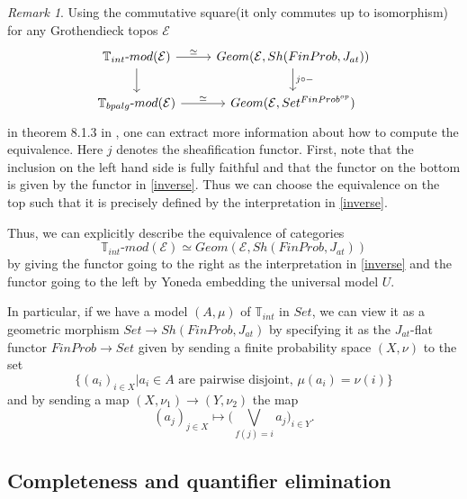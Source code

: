 \documentclass[a4paper]{amsproc}
\theoremstyle{plain}
\theoremstyle{definition}
\theoremstyle{remark}
\newtheorem{remark}[theorem]{Remark}
\numberwithin{equation}{section}
\begin{document}
\begin{remark} \label{classifying_equiv_data}
Using the commutative square(it only commutes up to isomorphism) for any Grothendieck topos $\mathcal{E}$
\[
\begin{tikzcd}
\mathbb{T}_{int}\text{-}mod(\mathcal{E}) \arrow[d] \arrow[r, "\simeq"] & {Geom(\mathcal{E},Sh(FinProb,J_{at}))} \arrow[d, "j \circ -"] \\
\mathbb{T}_{bpalg}\text{-}mod(\mathcal{E}) \arrow[r, "\simeq"]         & {Geom(\mathcal{E},Set^{FinProb^{op}})}                       
\end{tikzcd}
\]
in theorem 8.1.3 in \cite{caramello_book}, one can extract more information about how to compute the equivalence. Here $j$ denotes the sheafification functor. First, note that the inclusion on the left hand side is fully faithful and that the functor on the bottom is given by the functor in \ref{inverse}. Thus we can choose the equivalence on the top such that it is precisely defined by the interpretation in \ref{inverse}.

Thus, we can explicitly describe the equivalence of categories
\[
    \mathbb{T}_{int}\text{-}mod(\mathcal{E}) \simeq Geom(\mathcal{E},Sh(FinProb,J_{at}))
\]
by giving the functor going to the right as the interpretation in \ref{inverse} and the functor going to the left by Yoneda embedding the universal model $U$.

In particular, if we have a model $(A,\mu)$ of $\mathbb{T}_{int}$ in $Set$, we can view it as a geometric morphism $Set \to Sh(FinProb, J_{at})$ by specifying it as the $J_{at}$-flat functor $FinProb \to Set$ given by sending a finite probability space $(X,\nu)$ to the set
\[
\{(a_i)_{i \in X} | a_i \in A \text{ are pairwise disjoint, } \mu(a_i) = \nu(i) \}
\]
and by sending a map $(X,\nu_1) \to (Y,\nu_2)$ the map
\[
(a_j)_{j \in X} \mapsto \big (\bigvee_{f(j) = i} a_j \big )_{i \in Y} .
\]
\end{remark}


\subsection{Completeness and quantifier elimination}
\end{document}
